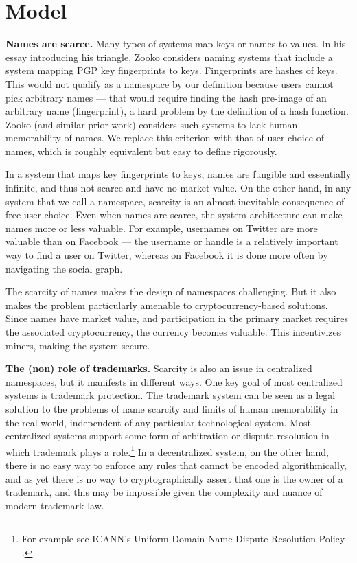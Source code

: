 \section{Model}
\label{sec:model}

{\bf Names are scarce.} Many types of systems map keys or names to values. In his essay introducing his triangle, Zooko considers naming systems that include a system mapping PGP key fingerprints to keys. Fingerprints are hashes of keys. This would not qualify as a namespace by our definition because users cannot pick arbitrary names --- that would require finding the hash pre-image of an arbitrary name (fingerprint), a hard problem by the definition of a hash function. Zooko (and similar prior work) considers such systems to lack human memorability of names. We replace this criterion with that of user choice of names, which is roughly equivalent but easy to define rigorously. 

In a system that maps key fingerprints to keys, names are fungible and essentially infinite, and thus not scarce and have no market value. On the other hand, in any system that we call a namespace, scarcity is an almost inevitable consequence of free user choice. Even when names are scarce, the system architecture can make names more or less valuable. For example, usernames on Twitter are more valuable than on Facebook --- the username or handle is a relatively important way to find a user on Twitter, whereas on Facebook it is done more often by navigating the social graph.

The scarcity of names makes the design of namespaces challenging. But it also makes the problem particularly amenable to cryptocurrency-based solutions. Since names have market value, and participation in the primary market requires the associated cryptocurrency, the currency becomes valuable. This incentivizes miners, making the system secure.

{\bf The (non) role of trademarks.} Scarcity is also an issue in centralized namespaces, but it manifests in different ways. One key goal of most centralized systems is trademark protection. The trademark system can be seen as a legal solution to the problems of name scarcity and limits of human memorability in the real world, independent of any particular technological system. Most centralized systems support some form of arbitration or dispute resolution in which trademark plays a role.\footnote{For example see ICANN's Uniform Domain-Name Dispute-Resolution Policy \cite{}.} In a decentralized system, on the other hand, there is no easy way to enforce any rules that cannot be encoded algorithmically, and as yet there is no way to cryptographically assert that one is the owner of a trademark, and this may be impossible given the complexity and nuance of modern trademark law.


